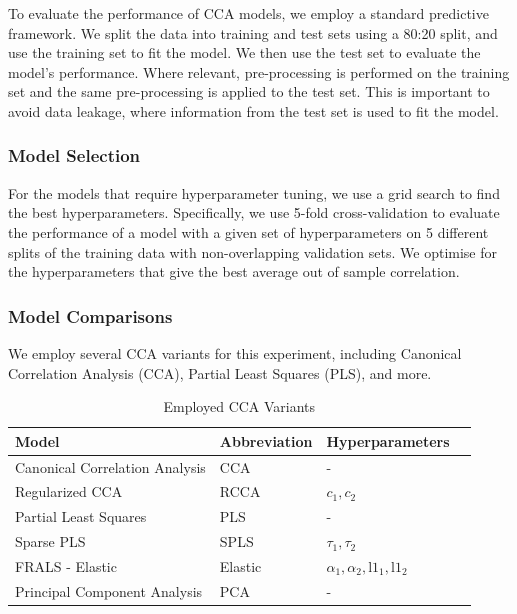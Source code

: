 To evaluate the performance of CCA models, we employ a standard predictive framework.
We split the data into training and test sets using a 80:20 split, and use the training set to fit the model.
We then use the test set to evaluate the model's performance.
Where relevant, pre-processing is performed on the training set and the same pre-processing is applied to the test set.
This is important to avoid data leakage, where information from the test set is used to fit the model.

\subsubsection{Model Selection}

For the models that require hyperparameter tuning, we use a grid search to find the best hyperparameters.
Specifically, we use 5-fold cross-validation to evaluate the performance of a model with a given set of hyperparameters on 5 different splits of the training data with non-overlapping validation sets.
We optimise for the hyperparameters that give the best average out of sample correlation.

\subsubsection{Model Comparisons}
We employ several CCA variants for this experiment, including Canonical Correlation Analysis (CCA), Partial Least Squares (PLS), and more.

\begin{table}[h]
\centering
\caption{Employed CCA Variants}
\begin{tabular}{|l|l|l|l|}
\hline
\textbf{Model} & \textbf{Abbreviation} & \textbf{Hyperparameters}  \\
\hline
Canonical Correlation Analysis & CCA & -   \\
\hline
Regularized CCA & RCCA & \(c_1, c_2\)   \\
\hline
Partial Least Squares & PLS & -   \\
\hline
Sparse PLS & SPLS & \(\tau_1, \tau_2\)   \\
\hline
FRALS - Elastic & Elastic & \(\alpha_1, \alpha_2, \text{l1}_1, \text{l1}_2\)   \\
\hline
Principal Component Analysis & PCA & -  \\
\hline
\end{tabular}\label{table:cca-variants}
\end{table}

